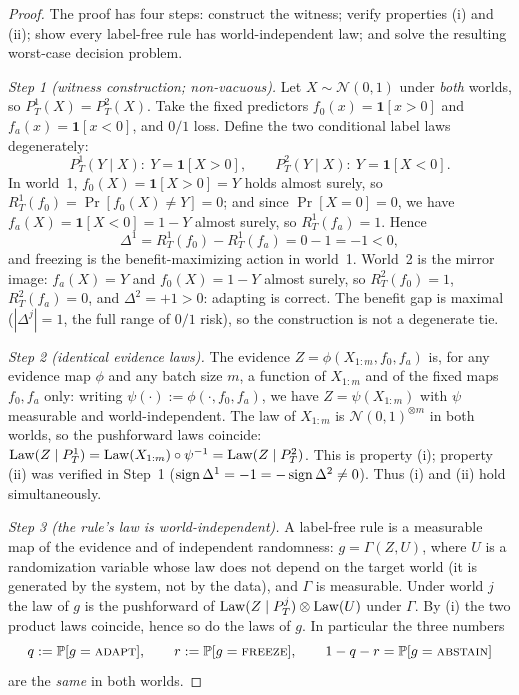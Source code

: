 \begin{proof}
The proof has four steps: construct the witness; verify properties (i) and
(ii); show every label-free rule has world-independent law; and solve the
resulting worst-case decision problem.

\emph{Step 1 (witness construction; non-vacuous).}
Let $X\sim\mathcal N(0,1)$ under \emph{both} worlds, so $P_T^1(X)=P_T^2(X)$.
Take the fixed predictors $f_0(x)=\mathbf 1[x>0]$ and
$f_a(x)=\mathbf 1[x<0]$, and $0/1$ loss. Define the two conditional label
laws degenerately:
\[
P_T^1(Y\mid X)\colon\ Y=\mathbf 1[X>0],
\qquad
P_T^2(Y\mid X)\colon\ Y=\mathbf 1[X<0].
\]
In world~1, $f_0(X)=\mathbf1[X>0]=Y$ holds almost surely, so
$R_T^1(f_0)=\Pr[f_0(X)\neq Y]=0$; and since $\Pr[X=0]=0$, we have
$f_a(X)=\mathbf1[X<0]=1-Y$ almost surely, so $R_T^1(f_a)=1$. Hence
\[
\Delta^1=R_T^1(f_0)-R_T^1(f_a)=0-1=-1<0,
\]
and freezing is the benefit-maximizing action in world~1. World~2 is the
mirror image: $f_a(X)=Y$ and $f_0(X)=1-Y$ almost surely, so
$R_T^2(f_0)=1$, $R_T^2(f_a)=0$, and $\Delta^2=+1>0$: adapting is correct.
The benefit gap is maximal ($|\Delta^j|=1$, the full range of $0/1$ risk),
so the construction is not a degenerate tie.

\emph{Step 2 (identical evidence laws).}
The evidence $Z=\phi(X_{1:m},f_0,f_a)$ is, for any evidence map $\phi$ and
any batch size $m$, a function of $X_{1:m}$ and of the fixed maps $f_0,f_a$
only: writing $\psi(\cdot):=\phi(\cdot,f_0,f_a)$, we have
$Z=\psi(X_{1:m})$ with $\psi$ measurable and world-independent. The law of
$X_{1:m}$ is $\mathcal N(0,1)^{\otimes m}$ in both worlds, so the
pushforward laws coincide:
$\Law(Z\mid P_T^1)=\Law(X_{1:m})\circ\psi^{-1}=\Law(Z\mid P_T^2)$. This is
property (i); property (ii) was verified in Step~1
($\sign\Delta^1=-1=-\sign\Delta^2\neq0$). Thus (i) and (ii) hold
simultaneously.

\emph{Step 3 (the rule's law is world-independent).}
A label-free rule is a measurable map of the evidence and of independent
randomness: $g=\Gamma(Z,U)$, where $U$ is a randomization variable whose
law does not depend on the target world (it is generated by the system, not
by the data), and $\Gamma$ is measurable. Under world $j$ the law of $g$ is
the pushforward of $\Law(Z\mid P_T^j)\otimes\Law(U)$ under $\Gamma$. By
(i) the two product laws coincide, hence so do the laws of $g$. In
particular the three numbers
\[
q:=\Pr[g=\textsc{adapt}],\qquad r:=\Pr[g=\textsc{freeze}],\qquad
1-q-r=\Pr[g=\textsc{abstain}]
\]
are the \emph{same} in both worlds.


\end{proof}
